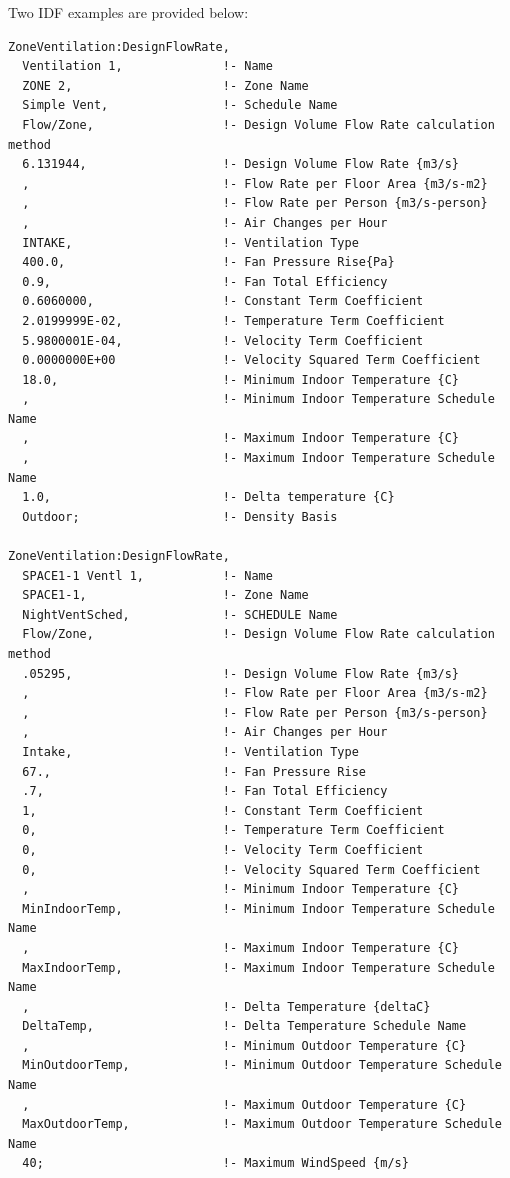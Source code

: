 Two IDF examples are provided below:

\begin{lstlisting}
ZoneVentilation:DesignFlowRate,
  Ventilation 1,              !- Name
  ZONE 2,                     !- Zone Name
  Simple Vent,                !- Schedule Name
  Flow/Zone,                  !- Design Volume Flow Rate calculation method
  6.131944,                   !- Design Volume Flow Rate {m3/s}
  ,                           !- Flow Rate per Floor Area {m3/s-m2}
  ,                           !- Flow Rate per Person {m3/s-person}
  ,                           !- Air Changes per Hour
  INTAKE,                     !- Ventilation Type
  400.0,                      !- Fan Pressure Rise{Pa}
  0.9,                        !- Fan Total Efficiency
  0.6060000,                  !- Constant Term Coefficient
  2.0199999E-02,              !- Temperature Term Coefficient
  5.9800001E-04,              !- Velocity Term Coefficient
  0.0000000E+00               !- Velocity Squared Term Coefficient
  18.0,                       !- Minimum Indoor Temperature {C}
  ,                           !- Minimum Indoor Temperature Schedule Name
  ,                           !- Maximum Indoor Temperature {C}
  ,                           !- Maximum Indoor Temperature Schedule Name
  1.0,                        !- Delta temperature {C}
  Outdoor;                    !- Density Basis

ZoneVentilation:DesignFlowRate,
  SPACE1-1 Ventl 1,           !- Name
  SPACE1-1,                   !- Zone Name
  NightVentSched,             !- SCHEDULE Name
  Flow/Zone,                  !- Design Volume Flow Rate calculation method
  .05295,                     !- Design Volume Flow Rate {m3/s}
  ,                           !- Flow Rate per Floor Area {m3/s-m2}
  ,                           !- Flow Rate per Person {m3/s-person}
  ,                           !- Air Changes per Hour
  Intake,                     !- Ventilation Type
  67.,                        !- Fan Pressure Rise
  .7,                         !- Fan Total Efficiency
  1,                          !- Constant Term Coefficient
  0,                          !- Temperature Term Coefficient
  0,                          !- Velocity Term Coefficient
  0,                          !- Velocity Squared Term Coefficient
  ,                           !- Minimum Indoor Temperature {C}
  MinIndoorTemp,              !- Minimum Indoor Temperature Schedule Name
  ,                           !- Maximum Indoor Temperature {C}
  MaxIndoorTemp,              !- Maximum Indoor Temperature Schedule Name
  ,                           !- Delta Temperature {deltaC}
  DeltaTemp,                  !- Delta Temperature Schedule Name
  ,                           !- Minimum Outdoor Temperature {C}
  MinOutdoorTemp,             !- Minimum Outdoor Temperature Schedule Name
  ,                           !- Maximum Outdoor Temperature {C}
  MaxOutdoorTemp,             !- Maximum Outdoor Temperature Schedule Name
  40;                         !- Maximum WindSpeed {m/s}
\end{lstlisting}

